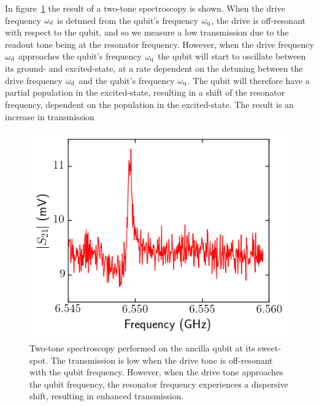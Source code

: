         In figure~\ref{fig:qubit spectroscopy} the result of a two-tone spectroscopy is shown. When the drive frequency $\omega_\text{d}$ is detuned from the qubit's frequency $\omega_\text{q}$, the drive is off-resonant with respect to the qubit, and so we measure a low transmission due to the readout tone being at the resonator frequency. However, when the drive frequency $\omega_\text{d}$ approaches the qubit's frequency $\omega_\text{q}$ the qubit will start to oscillate between its ground- and excited-state, at a rate dependent on the detuning between the drive frequency $\omega_\text{d}$ and the qubit's frequency $\omega_\text{q}$. The qubit will therefore have a partial population in the excited-state, resulting in a shift of the resonator frequency, dependent on the population in the excited-state. The result is an increase in transmission

        \begin{figure}
          \begin{center}
          \vspace{-30pt}
            \includegraphics[width=\textwidth]{../Figures/Qubit characterization/Spectroscopy.png}
          \end{center}
          \vspace{-20 pt}
          \caption{Two-tone spectroscopy performed on the ancilla qubit at its sweet-spot. The transmission is low when the drive tone is off-resonant with the qubit frequency. However, when the drive tone approaches the qubit frequency, the resonator frequency experiences a dispersive shift, resulting in enhanced transmission.}
          \label{fig:qubit spectroscopy}
        \end{figure}

